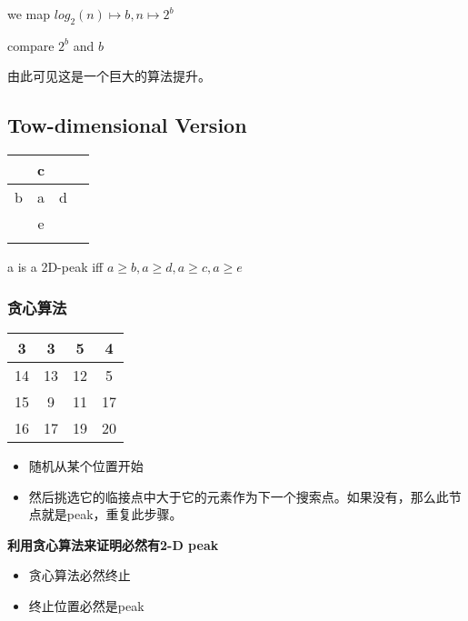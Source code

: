 \documentclass[11pt]{article}
\begin{document}
\begin{CJK}{UTF8}{gbsn}
\begin{itemize}
  we map $log_2(n)\mapsto b, n\mapsto 2^b$

  compare $2^b$ and $b$
\end{itemize}

由此可见这是一个巨大的算法提升。

\subsection{Tow-dimensional Version}

\begin{center}
  \begin{tabular}{|c|c|c|c|}
    \hline
     & c & &  \\\hline
    b & a & d & \\\hline
    & e & & \\\hline
    & & & \\
    \hline
  \end{tabular}
\end{center}

a is a 2D-peak iff $a \geq b, a \geq d, a \geq c, a \geq e$

\subsubsection{贪心算法}

\begin{center}
  \begin{tabular}{|c|c|c|c|}
    \hline
    3 & 3 & 5 & 4 \\\hline
    14 & 13 & 12 & 5 \\\hline
    15 & 9 & 11 & 17 \\\hline
    16 & 17 & 19 & 20 \\
    \hline
  \end{tabular}
\end{center}

\begin{itemize}
\item 随机从某个位置开始
\item 然后挑选它的临接点中大于它的元素作为下一个搜索点。如果没有，那么此节点就是peak，重复此步骤。
\end{itemize}

\textbf{利用贪心算法来证明必然有2-D peak}

\begin{itemize}
\item 贪心算法必然终止
\item 终止位置必然是peak
\end{itemize}


\end{CJK}
\end{document}
